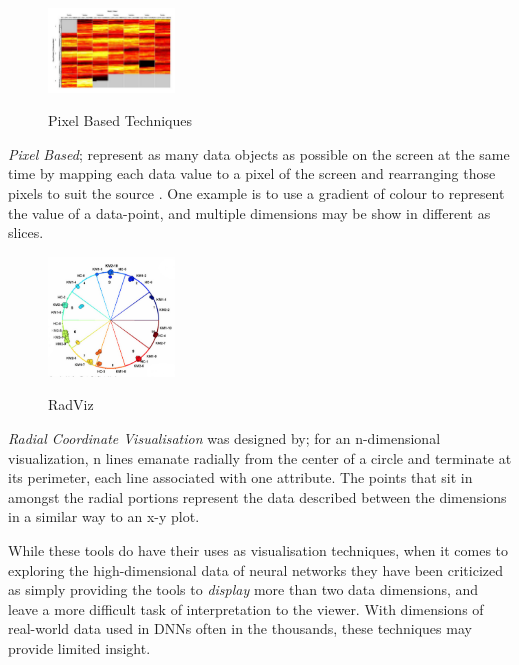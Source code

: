 \documentclass[a4paper,11pt,titlepage]{article}
\begin{document}
 	\begin{figure}[H]
    			\centering	
			{{\includegraphics[width=0.3\textwidth]
    				{img/kiem_pixel_two} 
    			}}%
    			\caption{Pixel Based Techniques}%
    		\label{fig:lascaux}
	\end{figure}	
 		
		\textit{Pixel Based}; represent as many data objects as possible on the screen at the same time by mapping each data value to a pixel of the screen and rearranging those pixels to suit the source \cite{Keim2000}. One example is to use a gradient of colour to represent the value of a data-point, and multiple dimensions may be show in different as slices.
		\par 
		 		
	\begin{figure}[H]
    			\centering	
			{{\includegraphics[width=0.3\textwidth]
    				{img/battista_vertices} 
    			}}%
    			\caption{RadViz}%
    		\label{fig:lascaux}
	\end{figure}	 		
 		
 		
		\textit{Radial Coordinate Visualisation} was designed by\cite{Hoffman1999}; for an n-dimensional visualization, n lines emanate radially from the center of a circle and terminate at its perimeter, each line associated with one attribute. The points that sit in amongst the radial portions represent the data described between the dimensions in a similar way to an x-y plot.
		
	\par 
	While these tools do have their uses as visualisation techniques, when it comes to exploring the high-dimensional data of neural networks they have been criticized \cite{Maaten2008} as simply providing the tools to \textit{display} more than two data dimensions, and leave a more difficult task of interpretation to the viewer. With dimensions of real-world data used in DNNs often in the thousands, these techniques may provide limited insight.
\\\
\\\
\end{document}
